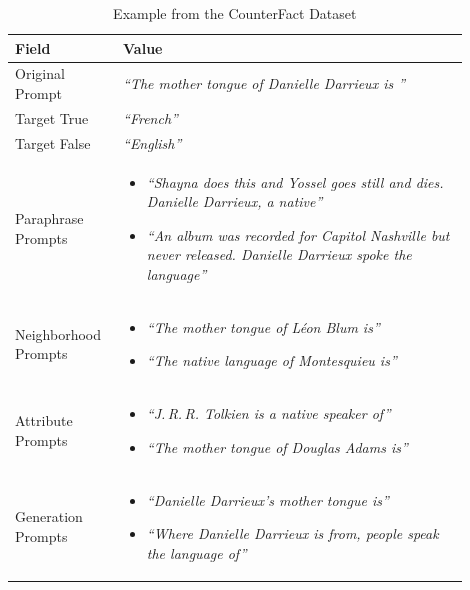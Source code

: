\documentclass{article}
\begin{document}
\begin{table}[ht]
  \centering
  \caption{Example from the CounterFact Dataset}
  \label{tab:counterfact-example}
  \begin{tabular}{|p{0.2\linewidth}|p{0.7\linewidth}|}
  \hline
  \textbf{Field} & \textbf{Value} \\
  \hline
  Original Prompt & \textit{``The mother tongue of Danielle Darrieux is ''} \\
  \hline
  Target True & \textit{``French''} \\
  \hline
  Target False & \textit{``English''} \\
  \hline
  Paraphrase Prompts & 
  \begin{itemize}
      \item \textit{``Shayna does this and Yossel goes still and dies. Danielle Darrieux, a native''}
      \item \textit{``An album was recorded for Capitol Nashville but never released. Danielle Darrieux spoke the language''}
  \end{itemize} \\
  \hline
  Neighborhood Prompts & 
  \begin{itemize}
      \item \textit{``The mother tongue of Léon Blum is''}
      \item \textit{``The native language of Montesquieu is''}
  \end{itemize} \\
  \hline
  Attribute Prompts & 
  \begin{itemize}
      \item \textit{``J.\,R.\,R. Tolkien is a native speaker of''}
      \item \textit{``The mother tongue of Douglas Adams is''}
  \end{itemize} \\
  \hline
  Generation Prompts & 
  \begin{itemize}
      \item \textit{``Danielle Darrieux's mother tongue is''}
      \item \textit{``Where Danielle Darrieux is from, people speak the language of''}
  \end{itemize} \\
  \hline
  \end{tabular}
  \end{table}
  
\end{document}
